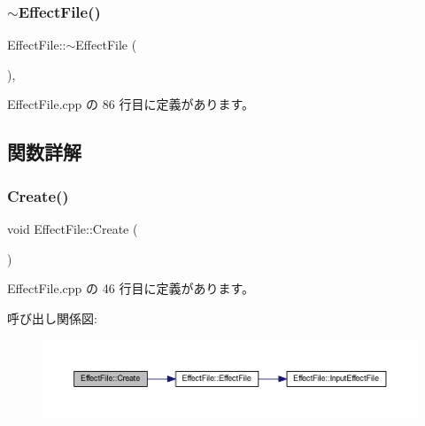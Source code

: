 \subsubsection{\texorpdfstring{$\sim$\+Effect\+File()}{~EffectFile()}}
{\footnotesize\ttfamily Effect\+File\+::$\sim$\+Effect\+File (\begin{DoxyParamCaption}{ }\end{DoxyParamCaption})\hspace{0.3cm}{\ttfamily [private]}, {\ttfamily [virtual]}}



 Effect\+File.\+cpp の 86 行目に定義があります。



\subsection{関数詳解}
\mbox{\label{class_effect_file_a637faf44d3465e7fe8a665d339680ba8}} 
\subsubsection{\texorpdfstring{Create()}{Create()}}
{\footnotesize\ttfamily void Effect\+File\+::\+Create (\begin{DoxyParamCaption}{ }\end{DoxyParamCaption})\hspace{0.3cm}{\ttfamily [static]}}



 Effect\+File.\+cpp の 46 行目に定義があります。

呼び出し関係図\+:
\nopagebreak
\begin{figure}[H]
\begin{center}
\leavevmode
\includegraphics[width=350pt]{class_effect_file_a637faf44d3465e7fe8a665d339680ba8_cgraph}
\end{center}
\end{figure}
\mbox{\label{class_effect_file_a0d9799f2ea38fa594b59e43183d70ce0}} 
